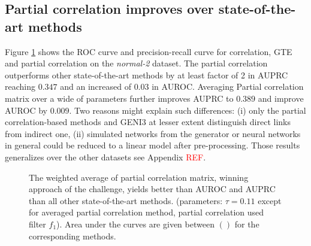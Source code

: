 \documentclass[wcp]{jmlr}
\begin{document}
\subsection*{Partial correlation improves over state-of-the-art methods}

Figure \ref{fig:curves} shows the ROC curve  and precision-recall curve
for correlation, GTE and partial correlation on the \textit{normal-2}
dataset. The partial correlation outperforms other state-of-the-art methods
by at least factor of 2 in AUPRC reaching $0.347$ and an increased of $0.03$ in
AUROC. Averaging Partial correlation matrix over a wide of parameters
further improves AUPRC to $0.389$ and improve AUROC by $0.009$.
Two reasons might explain such differences: (i) only the partial
correlation-based methods and GENI3 at lesser extent distinguish
direct links from indirect one, (ii) simulated networks from the
\citep{stetter2012model} generator or neural networks in general could be
reduced to a linear model after pre-processing. Those results
generalizes over the other datasets see Appendix \textcolor{red}{REF}.

\begin{figure}[bth]
\centering
{}
\caption{The weighted average of partial correlation matrix, winning approach
         of the challenge, yields better than AUROC and AUPRC than all
         other state-of-the-art methods. (parameters: $\tau=0.11$ except for
         averaged partial correlation method, partial correlation used
         filter $f_1$). Area under the curves are given between $()$
         for the corresponding methods.}
\label{fig:curves}
\end{figure}
\end{document}
